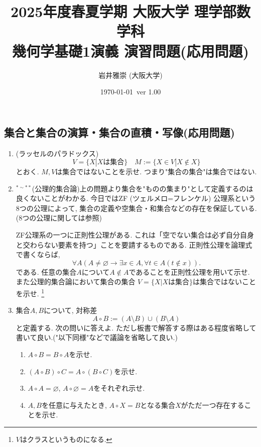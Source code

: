 \documentclass[dvipdfmx,a4paper,11pt]{article}
\title{2025年度春夏学期 大阪大学 理学部数学科 \\ 幾何学基礎1演義 演習問題(応用問題)}
\author{岩井雅崇 (大阪大学)}
\date{\today \, ver 1.00}
\theoremstyle{definition}
\begin{document}
\maketitle
\tableofcontents
\newpage

\begin{center}
\section{集合と集合の演算・集合の直積・写像(応用問題)}
\label{sec-1}
\end{center}

\begin{enumerate}[label=\textbf{問}\ref*{sec-1}.\arabic*]
 \setlength{\parskip}{0cm}
  \setlength{\itemsep}{7pt} 
  \item (ラッセルのパラドックス)　
  $$
  V=\{ X | \text{$X$は集合}\}
  \quad 
 M := \{ X \in V | X \not \in X\}
  $$
  とおく. 
  $M, V$は集合ではないことを示せ. 
  つまり"集合の集合"は集合ではない. 
  
  \item $^{* \sim **}$\label{1-regular}(公理的集合論)上の問題より集合を"ものの集まり"として定義するのは良くないことがわかる. 
  今日ではZF (ツェルメロ=フレンケル) 公理系という8つの公理によって, 集合の定義や空集合・和集合などの存在を保証している. (8つの公理に関しては\cite{tana}参照)
  
  ZF公理系の一つに正則性公理がある. これは「空でない集合は必ず自分自身と交わらない要素を持つ」ことを要請するものである. 
 正則性公理を論理式で書くならば, 
$$
\forall A (A \neq \varnothing \rightarrow \exists x \in A, \forall t \in A (t \notin x)).
$$
である. 
任意の集合$A$について$A \not \in A$であることを正則性公理を用いて示せ. 
また公理的集合論において集合の集合 $V=\{ X | \text{$X$は集合}\}$は集合ではないことを示せ. \footnote{$V$はクラスというものになる.}


\item  集合$A, B$について, 対称差
$$
A \circ B := (A \setminus B) \cup (B \setminus A)
$$
と定義する. 次の問いに答えよ. ただし板書で解答する際はある程度省略して書いて良い.("以下同様"などで議論を省略して良い.)
\begin{enumerate}[label=(\arabic*).]
 \setlength{\parskip}{0cm}
  \setlength{\itemsep}{0pt}
\item $A \circ B = B \circ A$を示せ. 
\item $(A \circ B) \circ C = A \circ (B \circ C)$を示せ. 
\item $A \circ A=\varnothing$, $A \circ \varnothing =A$をそれぞれ示せ. 
\item $A, B$を任意に与えたとき, $A \circ X=B$となる集合$X$がただ一つ存在することを示せ.
  \end{enumerate}


\end{enumerate}
\end{document}
